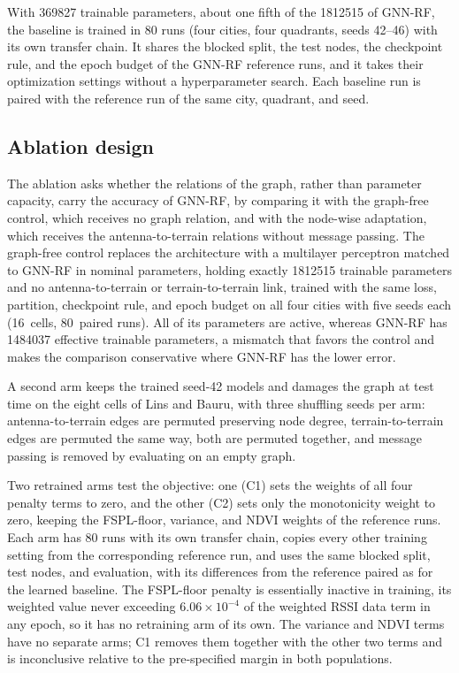 \documentclass{ieeeaccess}
\begin{document}
With \num{369827} trainable parameters, about one fifth of the \num{1812515} of GNN-RF, the baseline is trained in 80 runs (four cities, four quadrants, seeds 42--46) with its own transfer chain. It shares the blocked split, the test nodes, the checkpoint rule, and the epoch budget of the GNN-RF reference runs, and it takes their optimization settings without a hyperparameter search. Each baseline run is paired with the reference run of the same city, quadrant, and seed.

\subsection{Ablation design}
\label{sec:ablation_design}

The ablation asks whether the relations of the graph, rather than parameter capacity, carry the accuracy of GNN-RF, by comparing it with the graph-free control, which receives no graph relation, and with the node-wise adaptation, which receives the antenna-to-terrain relations without message passing. The graph-free control replaces the architecture with a multilayer perceptron matched to GNN-RF in nominal parameters, holding exactly \num{1812515} trainable parameters and no antenna-to-terrain or terrain-to-terrain link, trained with the same loss, partition, checkpoint rule, and epoch budget on all four cities with five seeds each (16~cells, 80~paired runs). All of its parameters are active, whereas GNN-RF has \num{1484037} effective trainable parameters, a mismatch that favors the control and makes the comparison conservative where GNN-RF has the lower error.

A second arm keeps the trained seed-42 models and damages the graph at test time on the eight cells of Lins and Bauru, with three shuffling seeds per arm: antenna-to-terrain edges are permuted preserving node degree, terrain-to-terrain edges are permuted the same way, both are permuted together, and message passing is removed by evaluating on an empty graph.

Two retrained arms test the objective: one (C1) sets the weights of all four penalty terms to zero, and the other (C2) sets only the monotonicity weight to zero, keeping the FSPL-floor, variance, and NDVI weights of the reference runs. Each arm has 80 runs with its own transfer chain, copies every other training setting from the corresponding reference run, and uses the same blocked split, test nodes, and evaluation, with its differences from the reference paired as for the learned baseline. The FSPL-floor penalty is essentially inactive in training, its weighted value never exceeding $6.06\times10^{-4}$ of the weighted RSSI data term in any epoch, so it has no retraining arm of its own. The variance and NDVI terms have no separate arms; C1 removes them together with the other two terms and is inconclusive relative to the pre-specified margin in both populations.
\end{document}
